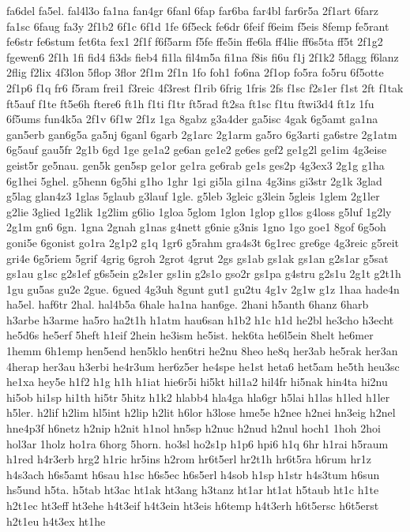 {fa6del
fa5el.
fal4l3o
fa1na
fan4gr
6fanl
6fap
far6ba
far4bl
far6r5a
2f1art
6farz
fa1sc
6faug
fa3y
2f1b2
6f1c
6f1d
1fe
6f5eck
fe6dr
6feif
f6eim
f5eis
8femp
fe5rant
fe6str
fe6stum
fet6ta
fex1
2f1f
f6f5arm
f5fe
ffe5in
ffe6la
ff4lie
ff6s5ta
ff5t
2f1g2
fgewen6
2f1h
1fi
fid4
fi3ds
fieb4
fi1la
fil4m5a
fi1na
f8is
fi6u
f1j
2f1k2
5flagg
f6lanz
2flig
f2lix
4f3lon
5flop
3flor
2f1m
2f1n
1fo
foh1
fo6na
2f1op
fo5ra
fo5ru
6f5otte
2f1p6
f1q
fr6
f5ram
frei1
f3reic
4f3rest
f1rib
6frig
1fris
2fs
f1sc
f2s1er
f1st
2ft
f1tak
ft5auf
f1te
ft5e6h
ftere6
ft1h
f1ti
f1tr
ft5rad
ft2sa
ft1sc
f1tu
ftwi3d4
ft1z
1fu
6f5ums
fun4k5a
2f1v
6f1w
2f1z
1ga
8gabz
g3a4der
ga5isc
4gak
6g5amt
ga1na
gan5erb
gan6g5a
ga5nj
6ganl
6garb
2g1arc
2g1arm
ga5ro
6g3arti
ga6stre
2g1atm
6g5auf
gau5fr
2g1b
6gd
1ge
ge1a2
ge6an
ge1e2
ge6es
gef2
ge1g2l
ge1im
4g3eise
geist5r
ge5nau.
gen5k
gen5sp
ge1or
ge1ra
ge6rab
ge1s
ges2p
4g3ex3
2g1g
g1ha
6g1hei
5ghel.
g5henn
6g5hi
g1ho
1ghr
1gi
gi5la
gi1na
4g3ins
gi3str
2g1k
3glad
g5lag
glan4z3
1glas
5glaub
g3lauf
1gle.
g5leb
3gleic
g3lein
5gleis
1glem
2g1ler
g2lie
3glied
1g2lik
1g2lim
g6lio
1gloa
5glom
1glon
1glop
g1los
g4loss
g5luf
1g2ly
2g1m
gn6
6gn.
1gna
2gnah
g1nas
g4nett
g6nie
g3nis
1gno
1go
goe1
8gof
6g5oh
goni5e
6gonist
go1ra
2g1p2
g1q
1gr6
g5rahm
gra4s3t
6g1rec
gre6ge
4g3reic
g5reit
gri4e
6g5riem
5grif
4grig
6groh
2grot
4grut
2gs
gs1ab
gs1ak
gs1an
g2s1ar
g5sat
gs1au
g1sc
g2s1ef
g6s5ein
g2s1er
gs1in
g2s1o
gso2r
gs1pa
g4stru
g2s1u
2g1t
g2t1h
1gu
gu5as
gu2e
2gue.
6gued
4g3uh
8gunt
gut1
gu2tu
4g1v
2g1w
g1z
1haa
hade4n
ha5el.
haf6tr
2hal.
hal4b5a
6hale
ha1na
han6ge.
2hani
h5anth
6hanz
6harb
h3arbe
h3arme
ha5ro
ha2t1h
h1atm
hau6san
h1b2
h1c
h1d
he2bl
he3cho
h3echt
he5d6s
he5erf
5heft
h1eif
2hein
he3ism
he5ist.
hek6ta
he6l5ein
8helt
he6mer
1hemm
6h1emp
hen5end
hen5klo
hen6tri
he2nu
8heo
he8q
her3ab
he5rak
her3an
4herap
her3au
h3erbi
he4r3um
her6z5er
he4spe
he1st
heta6
het5am
he5th
heu3sc
he1xa
hey5e
h1f2
h1g
h1h
h1iat
hie6r5i
hi5kt
hil1a2
hil4fr
hi5nak
hin4ta
hi2nu
hi5ob
hi1sp
hi1th
hi5tr
5hitz
h1k2
hlabb4
hla4ga
hla6gr
h5lai
h1las
h1led
h1ler
h5ler.
h2lif
h2lim
hl5int
h2lip
h2lit
h6lor
h3lose
hme5e
h2nee
h2nei
hn3eig
h2nel
hne4p3f
h6netz
h2nip
h2nit
h1nol
hn5sp
h2nuc
h2nud
h2nul
hoch1
1hoh
2hoi
hol3ar
1holz
ho1ra
6horg
5horn.
ho3sl
ho2s1p
h1p6
hpi6
h1q
6hr
h1rai
h5raum
h1red
h4r3erb
hrg2
h1ric
hr5ins
h2rom
hr6t5erl
hr2t1h
hr6t5ra
h6rum
hr1z
h4s3ach
h6s5amt
h6sau
h1sc
h6s5ec
h6s5erl
h4sob
h1sp
h1str
h4s3tum
h6sun
hs5und
h5ta.
h5tab
ht3ac
ht1ak
ht3ang
h3tanz
ht1ar
ht1at
h5taub
ht1c
h1te
h2t1ec
ht3eff
ht3ehe
h4t3eif
h4t3ein
ht3eis
h6temp
h4t3erh
h6t5ersc
h6t5erst
h2t1eu
h4t3ex
ht1he
}
